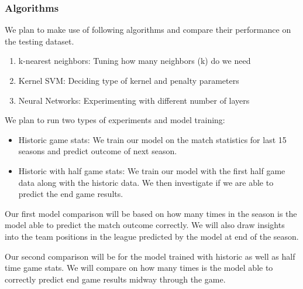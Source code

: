 \documentclass[11pt,letterpaper]{article}
\begin{document}
\subsubsection*{Algorithms}
We plan to make use of following algorithms and compare their performance on the testing dataset.
\begin{enumerate}
    \item k-nearest neighbors: Tuning how many neighbors (k) do we need
    \item Kernel SVM: Deciding type of kernel and penalty parameters
    \item Neural Networks: Experimenting with different number of layers
\end{enumerate}
We plan to run two types of experiments and model training:
\begin{itemize}
    \item Historic game stats: We train our model on the match statistics for last 15 seasons and predict outcome of next season. 
    \item Historic with half game stats: We train our model with the first half game data along with the historic data. We then investigate if we are able to predict the end game results. 
\end{itemize}
Our first model comparison will be based on how many times in the season is the model able to predict the match outcome correctly. We will also draw insights into the team positions in the league predicted by the model at end of the season.

Our second comparison will be for the model trained with historic as well as half time game stats. We will compare on how many times is the model able to correctly predict end game results midway through the game. 
\end{document}
